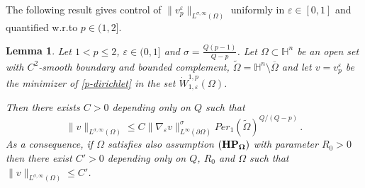 \documentclass[10pt]{amsart}
\numberwithin{equation}{section}
\newtheorem{proposition}[theorem]{Proposition}
\newtheorem{lemma}[theorem]{Lemma}
\theoremstyle{definition}
\newcommand{\He}{\mathbb{H}}
\begin{document}
The following result gives control of $\| v^\varepsilon_p \|_{L^{\sigma,\infty}(\Omega)}$ uniformly in $\varepsilon \in[0,1]$ and quantified w.r.to $p \in (1,2]$.
\begin{lemma}
\label{weak-Lp}
Let  $1<p\leq 2$, $\varepsilon \in (0,1]$ and $\sigma=\frac{Q(p-1)}{Q-p}$. Let $\Omega \subset \He^n$ be an open set with $C^2$-smooth boundary and bounded complement,  $\widetilde{\Omega}=  \He^n \setminus \overline{\Omega}$ and let $v=v^\varepsilon_p$ be the minimizer of \eqref{p-dirichlet} in the set $\dot{W}^{1,p}_{1, \varepsilon} (\Omega)$.

Then there exists $C>0$ depending only on $Q$ such that
\begin{equation}
\label{weak-Lsigma}
	\| v \|_{L^{\sigma,\infty}(\Omega)} \leq C \| \nabla_\varepsilon v\|^\sigma_{L^\infty(\partial \Omega)} Per_1(\widetilde{\Omega})^{Q/(Q-p)} \, .
\end{equation}
As a consequence, if $\Omega$ satisfies also assumption $(\bf{HP_\Omega})$
with parameter $R_0>0$ then there exist $C'>0$ depending only on $Q$, $R_0$ and $\Omega$ such that $\| v \|_{L^{\sigma,\infty}(\Omega)} \leq C' $.
\end{lemma}



\end{document}
